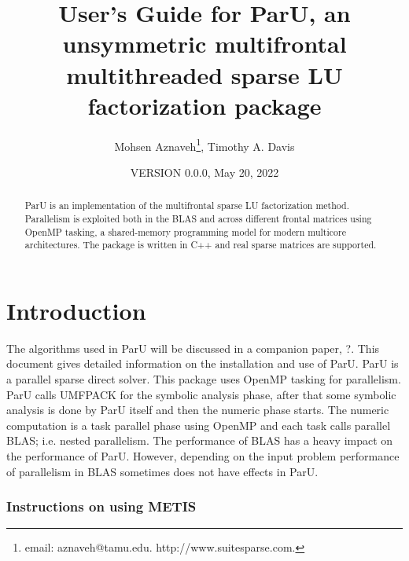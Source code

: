 \documentclass[12pt]{article}
\title{User's Guide for ParU, an unsymmetric multifrontal multithreaded sparse
LU factorization package}
\author{Mohsen Aznaveh\thanks{
email: aznaveh@tamu.edu.
http://www.suitesparse.com.
},
Timothy A. Davis}
\date{VERSION 0.0.0, May 20, 2022}
\begin{document}
\maketitle

\begin{abstract}

ParU is an implementation of the multifrontal sparse LU factorization
method.  Parallelism is exploited both in the BLAS and across different frontal
matrices using OpenMP tasking, a shared-memory programming model for modern 
multicore architectures. The package is written in C++ and real sparse matrices 
are supported.

\end{abstract}

\maketitle

\section{Introduction}
\label{intro}

The algorithms used in ParU will be discussed in a companion paper,
?. This document gives detailed information on the installation
and use of ParU.
ParU is a parallel sparse direct solver. This package uses OpenMP
tasking for parallelism. ParU calls UMFPACK for the symbolic analysis phase,
after that some symbolic analysis is done by ParU itself and  then the numeric
phase starts. The numeric computation is a task parallel phase using OpenMP
and each task calls parallel BLAS; i.e. nested parallelism. 
The performance of BLAS has a heavy impact on the performance of ParU.
However, depending on the input problem performance of parallelism in BLAS 
sometimes does not have effects in ParU.


\subsubsection{Instructions on using METIS}
\end{document}
